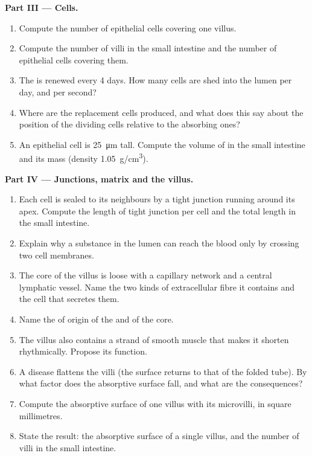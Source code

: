 \begin{problem}
\medskip
\noindent\textbf{Part III --- Cells.}
\begin{enumerate}[resume]
  \item Compute the number of epithelial cells covering one villus.
  \item Compute the number of villi in the small intestine and the
        number of epithelial cells covering them.
  \item The  is renewed every \qty{4}{} days. How many cells
        are shed into the lumen per day, and per second?
  \item Where are the replacement cells produced, and what does this
        say about the position of the dividing cells relative to the
        absorbing ones?
  \item An epithelial cell is \qty{25}{\micro m} tall. Compute the
        volume of  in the small intestine and its mass
        (density \qty{1.05}{g/cm^3}).
\end{enumerate}

\medskip
\noindent\textbf{Part IV --- Junctions, matrix and the villus.}
\begin{enumerate}[resume]
  \item Each cell is sealed to its neighbours by a tight junction
        running around its apex. Compute the length of tight junction
        per cell and the total length in the small intestine.
  \item Explain why a substance in the lumen can reach the blood only
        by crossing two cell membranes.
  \item The core of the villus is loose  with a
        capillary network and a central lymphatic vessel. Name the two
        kinds of extracellular fibre it contains and the cell that
        secretes them.
  \item Name the  of origin of the  and of the
        core.
  \item The villus also contains a strand of smooth muscle that makes
        it shorten rhythmically. Propose its function.
  \item A disease flattens the villi (the surface returns to that of
        the folded tube). By what factor does the absorptive surface
        fall, and what are the consequences?
  \item Compute the absorptive surface of one villus with its
        microvilli, in square millimetres.
  \item State the result: the absorptive surface of a single villus,
        and the number of villi in the small intestine.
\end{enumerate}
\end{problem}
